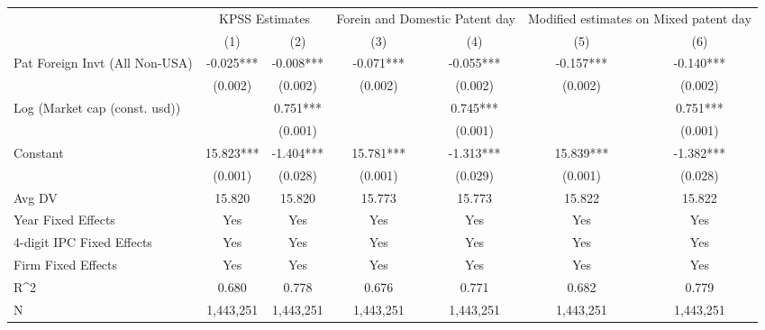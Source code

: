 {
\def\sym#1{\ifmmode^{#1}\else\(^{#1}\)\fi}
\begin{tabular}{l*{6}{c}}
\hline\hline
                    &\multicolumn{2}{c}{KPSS Estimates}&\multicolumn{2}{c}{Forein and Domestic Patent day}&\multicolumn{2}{c}{Modified estimates on Mixed patent day }\\\cmidrule(lr){2-3}\cmidrule(lr){4-5}\cmidrule(lr){6-7}
                    &\multicolumn{1}{c}{(1)}   &\multicolumn{1}{c}{(2)}   &\multicolumn{1}{c}{(3)}   &\multicolumn{1}{c}{(4)}   &\multicolumn{1}{c}{(5)}   &\multicolumn{1}{c}{(6)}   \\
\hline
Pat Foreign Invt (All Non-USA)&      -0.025***&      -0.008***&      -0.071***&      -0.055***&      -0.157***&      -0.140***\\
                    &     (0.002)   &     (0.002)   &     (0.002)   &     (0.002)   &     (0.002)   &     (0.002)   \\
Log (Market cap (const. usd))&               &       0.751***&               &       0.745***&               &       0.751***\\
                    &               &     (0.001)   &               &     (0.001)   &               &     (0.001)   \\
Constant            &      15.823***&      -1.404***&      15.781***&      -1.313***&      15.839***&      -1.382***\\
                    &     (0.001)   &     (0.028)   &     (0.001)   &     (0.029)   &     (0.001)   &     (0.028)   \\
\hline
Avg DV              &      15.820   &      15.820   &      15.773   &      15.773   &      15.822   &      15.822   \\
Year Fixed Effects  &         Yes   &         Yes   &         Yes   &         Yes   &         Yes   &         Yes   \\
4-digit IPC Fixed Effects&         Yes   &         Yes   &         Yes   &         Yes   &         Yes   &         Yes   \\
Firm Fixed Effects  &         Yes   &         Yes   &         Yes   &         Yes   &         Yes   &         Yes   \\
R^2                 &       0.680   &       0.778   &       0.676   &       0.771   &       0.682   &       0.779   \\
N                   &   1,443,251   &   1,443,251   &   1,443,251   &   1,443,251   &   1,443,251   &   1,443,251   \\
\hline\hline
\end{tabular}
}
